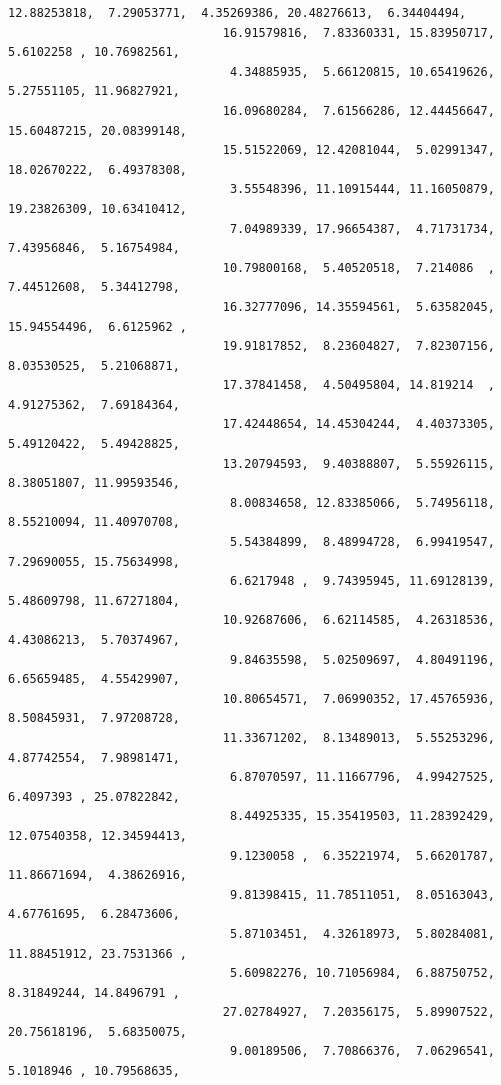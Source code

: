 \documentclass[11pt]{article}
\begin{document}
\begin{Verbatim}[commandchars=\\\{\}]
                              12.88253818,  7.29053771,  4.35269386, 20.48276613,  6.34404494,
                              16.91579816,  7.83360331, 15.83950717,  5.6102258 , 10.76982561,
                               4.34885935,  5.66120815, 10.65419626,  5.27551105, 11.96827921,
                              16.09680284,  7.61566286, 12.44456647, 15.60487215, 20.08399148,
                              15.51522069, 12.42081044,  5.02991347, 18.02670222,  6.49378308,
                               3.55548396, 11.10915444, 11.16050879, 19.23826309, 10.63410412,
                               7.04989339, 17.96654387,  4.71731734,  7.43956846,  5.16754984,
                              10.79800168,  5.40520518,  7.214086  ,  7.44512608,  5.34412798,
                              16.32777096, 14.35594561,  5.63582045, 15.94554496,  6.6125962 ,
                              19.91817852,  8.23604827,  7.82307156,  8.03530525,  5.21068871,
                              17.37841458,  4.50495804, 14.819214  ,  4.91275362,  7.69184364,
                              17.42448654, 14.45304244,  4.40373305,  5.49120422,  5.49428825,
                              13.20794593,  9.40388807,  5.55926115,  8.38051807, 11.99593546,
                               8.00834658, 12.83385066,  5.74956118,  8.55210094, 11.40970708,
                               5.54384899,  8.48994728,  6.99419547,  7.29690055, 15.75634998,
                               6.6217948 ,  9.74395945, 11.69128139,  5.48609798, 11.67271804,
                              10.92687606,  6.62114585,  4.26318536,  4.43086213,  5.70374967,
                               9.84635598,  5.02509697,  4.80491196,  6.65659485,  4.55429907,
                              10.80654571,  7.06990352, 17.45765936,  8.50845931,  7.97208728,
                              11.33671202,  8.13489013,  5.55253296,  4.87742554,  7.98981471,
                               6.87070597, 11.11667796,  4.99427525,  6.4097393 , 25.07822842,
                               8.44925335, 15.35419503, 11.28392429, 12.07540358, 12.34594413,
                               9.1230058 ,  6.35221974,  5.66201787, 11.86671694,  4.38626916,
                               9.81398415, 11.78511051,  8.05163043,  4.67761695,  6.28473606,
                               5.87103451,  4.32618973,  5.80284081, 11.88451912, 23.7531366 ,
                               5.60982276, 10.71056984,  6.88750752,  8.31849244, 14.8496791 ,
                              27.02784927,  7.20356175,  5.89907522, 20.75618196,  5.68350075,
                               9.00189506,  7.70866376,  7.06296541,  5.1018946 , 10.79568635,

\end{Verbatim}
\end{document}
